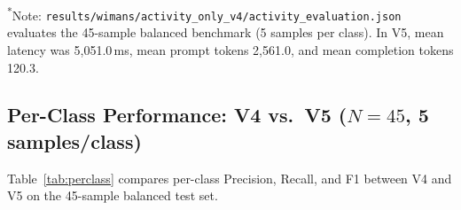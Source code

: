 \documentclass[11pt,a4paper]{article}
\begin{document}
\begin{table}[H]
\centering
\caption{WiMANS 9-Class Single-Person Activity-Only LLM Results (\texttt{gemini-3.5-flash-lite})}
\label{tab:progression}
\vspace{0.3em}
\begin{flushleft}
\footnotesize{\textsuperscript{*}Note: \texttt{results/wimans/activity\_only\_v4/activity\_evaluation.json} evaluates the 45-sample balanced benchmark (5 samples per class). In V5, mean latency was 5,051.0\,ms, mean prompt tokens 2,561.0, and mean completion tokens 120.3.}
\end{flushleft}
\end{table}

\subsection{Per-Class Performance: V4 vs.\ V5 ($N=45$, 5 samples/class)}
Table~\ref{tab:perclass} compares per-class Precision, Recall, and F1 between V4 and V5 on the 45-sample balanced test set.
\end{document}
